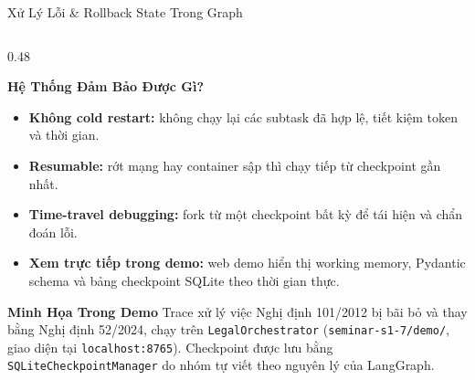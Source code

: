\documentclass[aspectratio=1610,10pt,xcolor={table}]{beamer}
\begin{document}
\begin{frame}{Xử Lý Lỗi \& Rollback State Trong Graph}
\begin{columns}[t]
    \begin{column}{0.48\textwidth}
      \begin{alertblock}{\textbf{Hệ Thống Đảm Bảo Được Gì?}}
        \footnotesize
        \begin{itemize}
          \item \textbf{Không cold restart:} không chạy lại các subtask đã hợp lệ, tiết kiệm token và thời gian.
          \item \textbf{Resumable:} rớt mạng hay container sập thì chạy tiếp từ checkpoint gần nhất.
          \item \textbf{Time-travel debugging:} fork từ một checkpoint bất kỳ để tái hiện và chẩn đoán lỗi.
          \item \textbf{Xem trực tiếp trong demo:} web demo hiển thị working memory, Pydantic schema và bảng checkpoint SQLite theo thời gian thực.
        \end{itemize}
      \end{alertblock}
      \begin{block}{\scriptsize \textbf{Minh Họa Trong Demo}}
        \tiny Trace xử lý việc Nghị định 101/2012 bị bãi bỏ và thay bằng Nghị định 52/2024, chạy trên \texttt{LegalOrchestrator} (\texttt{seminar-s1-7/demo/}, giao diện tại \texttt{localhost:8765}). Checkpoint được lưu bằng \texttt{SQLiteCheckpointManager} do nhóm tự viết theo nguyên lý của LangGraph.
      \end{block}
    \end{column}
  \end{columns}
\end{frame}
\end{document}
